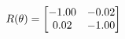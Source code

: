 \documentclass[preview]{standalone}
\begin{document}
\begin{align*}
\special{dvisvgm:raw <g id='unique000'>}R(\theta) = \begin{bmatrix}-1.00 & -0.02\\0.02 & -1.00\end{bmatrix}\special{dvisvgm:raw </g>}
\end{align*}
\end{document}
